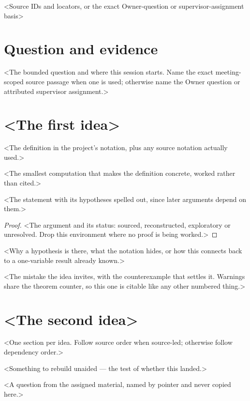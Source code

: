\documentclass[a4paper,10pt]{article}
\begin{document}
%
  {<Source IDs and locators, or the exact Owner-question or supervisor-assignment basis>}

\section{Question and evidence}
<The bounded question and where this session starts. Name the exact meeting-scoped source passage
when one is used; otherwise name the Owner question or attributed supervisor assignment.>

\section{<The first idea>}

\begin{defn}[<term>]
<The definition in the project's notation, plus any source notation actually used.>
\end{defn}

\begin{example}
<The smallest computation that makes the definition concrete, worked rather than cited.>
\end{example}

\begin{thm}[<name>]
<The statement with its hypotheses spelled out, since later arguments depend on them.>
\end{thm}

\begin{proof}
<The argument and its status: sourced, reconstructed, exploratory or unresolved. Drop this
environment where no proof is being worked.>
\end{proof}

\begin{remark}
<Why a hypothesis is there, what the notation hides, or how this connects back to a one-variable
result already known.>
\end{remark}

\begin{warning}
<The mistake the idea invites, with the counterexample that settles it. Warnings share the
theorem counter, so this one is citable like any other numbered thing.>
\end{warning}

\section{<The second idea>}
<One section per idea. Follow source order when source-led; otherwise follow dependency order.>

\begin{checkyourself}
  \item <Something to rebuild unaided --- the test of whether this landed.>
  \item <A question from the assigned material, named by pointer and never copied here.>
\end{checkyourself}
\end{document}
